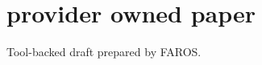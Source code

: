 \documentclass{article}
\begin{document}
\section*{provider owned paper}
Tool-backed draft prepared by FAROS.
\end{document}
